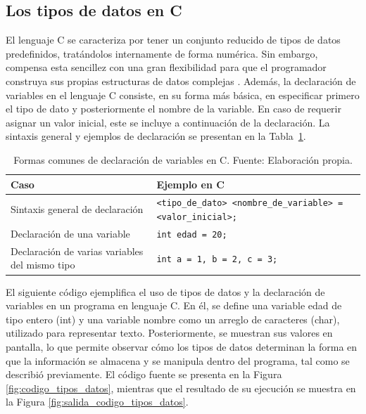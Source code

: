 \subsection{Los tipos de datos en C}

El lenguaje C se caracteriza por tener un conjunto reducido de tipos de datos predefinidos, tratándolos internamente de forma numérica. Sin embargo, compensa esta sencillez con una gran flexibilidad para que el programador construya sus propias estructuras de datos complejas \cite{frem_ref2}. Además, la declaración de variables en el lenguaje C consiste, en su forma más básica, en especificar primero el tipo de dato y posteriormente el nombre de la variable. En caso de requerir asignar un valor inicial, este se incluye a continuación de la declaración. La sintaxis general y ejemplos de declaración se presentan en la Tabla~\ref{tab:declaracion_variables_c}.



\begin{table}[H]
    \centering
    \begin{tabular}{|p{4.5cm}|p{8.5cm}|}
        \hline
        \textbf{Caso} & \textbf{Ejemplo en C} \\
        \hline
        Sintaxis general de declaración & \texttt{<tipo\_de\_dato> <nombre\_de\_variable> = <valor\_inicial>;} \\
        \hline
        Declaración de una variable & \texttt{int edad = 20;} \\
        \hline
        Declaración de varias variables del mismo tipo & \texttt{int a = 1, b = 2, c = 3;} \\
        \hline
    \end{tabular}
    \caption{Formas comunes de declaración de variables en C. Fuente: Elaboración propia.}
    \label{tab:declaracion_variables_c}
\end{table}

El siguiente código ejemplifica el uso de tipos de datos y la declaración de variables en un programa en lenguaje C. En él, se define una variable edad de tipo entero (int) y una variable nombre como un arreglo de caracteres (char), utilizado para representar texto. Posteriormente, se muestran sus valores en pantalla, lo que permite observar cómo los tipos de datos determinan la forma en que la información se almacena y se manipula dentro del programa, tal como se describió previamente. El código fuente se presenta en la Figura \ref{fig:codigo_tipos_datos}, mientras que el resultado de su ejecución se muestra en la Figura \ref{fig:salida_codigo_tipos_datos}.

